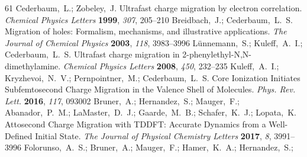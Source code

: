\documentclass[journal=jacsat,manuscript=article]{achemso}
\begin{document}
\begin{mcitethebibliography}{61}
\mciteBstWouldAddEndPuncttrue
\mciteSetBstMidEndSepPunct{\mcitedefaultmidpunct}
{\mcitedefaultendpunct}{\mcitedefaultseppunct}\relax
\EndOfBibitem
{}
Cederbaum,~L.; Zobeley,~J. Ultrafast charge migration by electron correlation.
  \emph{Chemical Physics Letters} \textbf{1999}, \emph{307}, 205--210\relax
\mciteBstWouldAddEndPuncttrue
\mciteSetBstMidEndSepPunct{\mcitedefaultmidpunct}
{\mcitedefaultendpunct}{\mcitedefaultseppunct}\relax
\EndOfBibitem
{}
Breidbach,~J.; Cederbaum,~L.~S. Migration of holes: Formalism, mechanisms, and
  illustrative applications. \emph{The Journal of Chemical Physics}
  \textbf{2003}, \emph{118}, 3983--3996\relax
\mciteBstWouldAddEndPuncttrue
\mciteSetBstMidEndSepPunct{\mcitedefaultmidpunct}
{\mcitedefaultendpunct}{\mcitedefaultseppunct}\relax
\EndOfBibitem
{}
Lünnemann,~S.; Kuleff,~A.~I.; Cederbaum,~L.~S. Ultrafast charge migration in
  2-phenylethyl-N,N-dimethylamine. \emph{Chemical Physics Letters}
  \textbf{2008}, \emph{450}, 232--235\relax
\mciteBstWouldAddEndPuncttrue
\mciteSetBstMidEndSepPunct{\mcitedefaultmidpunct}
{\mcitedefaultendpunct}{\mcitedefaultseppunct}\relax
\EndOfBibitem
{}
Kuleff,~A.~I.; Kryzhevoi,~N.~V.; Pernpointner,~M.; Cederbaum,~L.~S. Core
  Ionization Initiates Subfemtosecond Charge Migration in the Valence Shell of
  Molecules. \emph{Phys. Rev. Lett.} \textbf{2016}, \emph{117}, 093002\relax
\mciteBstWouldAddEndPuncttrue
\mciteSetBstMidEndSepPunct{\mcitedefaultmidpunct}
{\mcitedefaultendpunct}{\mcitedefaultseppunct}\relax
\EndOfBibitem
{}
Bruner,~A.; Hernandez,~S.; Mauger,~F.; Abanador,~P.~M.; LaMaster,~D.~J.;
  Gaarde,~M.~B.; Schafer,~K.~J.; Lopata,~K. Attosecond Charge Migration with
  TDDFT: Accurate Dynamics from a Well-Defined Initial State. \emph{The Journal
  of Physical Chemistry Letters} \textbf{2017}, \emph{8}, 3991--3996\relax
\mciteBstWouldAddEndPuncttrue
\mciteSetBstMidEndSepPunct{\mcitedefaultmidpunct}
{\mcitedefaultendpunct}{\mcitedefaultseppunct}\relax
\EndOfBibitem
{}
Folorunso,~A.~S.; Bruner,~A.; Mauger,~F.; Hamer,~K.~A.; Hernandez,~S.;

\end{mcitethebibliography}
\end{document}
